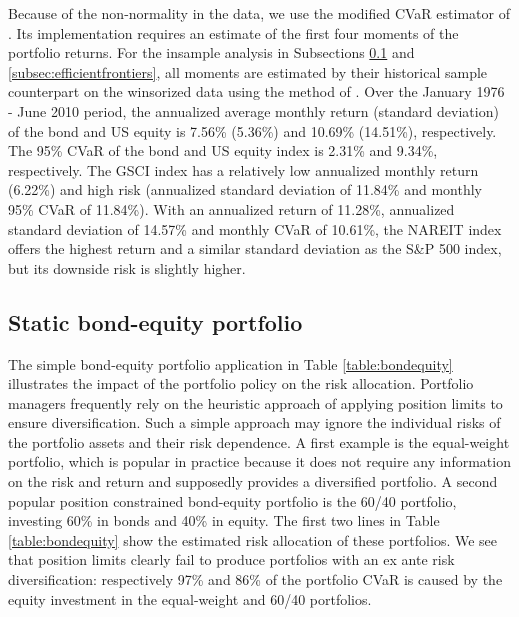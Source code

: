 \documentclass[12pt,a4paper]{article}
\begin{document}
Because of the non-normality in the data, we use the modified CVaR estimator of \citet{Boudt2007}. Its implementation requires an estimate of the first four moments of the portfolio returns. For the insample analysis in Subsections \ref{subsec:bondequity} and \ref{subsec:efficientfrontiers}, all moments are estimated by their historical sample counterpart on the winsorized data using the method of \citet{Boudt2007}. Over the January 1976 - June 2010 period, the annualized average monthly return (standard deviation) of the bond and US equity is 7.56\% (5.36\%) and 10.69\% (14.51\%), respectively. The 95\% CVaR of the bond and US equity index is 2.31\% and 9.34\%, respectively. The GSCI index has a relatively low annualized monthly return (6.22\%) and high risk (annualized standard deviation of 11.84\% and monthly 95\% CVaR of 11.84\%). With an annualized return of 11.28\%, annualized standard deviation of 14.57\% and monthly CVaR of 10.61\%, the NAREIT index offers the highest return and a similar standard deviation as the S\&P 500 index, but its downside risk is slightly higher.
 
 




\subsection{Static bond-equity portfolio}\label{subsec:bondequity}

The simple bond-equity portfolio application in Table \ref{table:bondequity} illustrates the impact of the portfolio policy on the risk allocation. Portfolio managers frequently rely on the heuristic approach of applying position limits to ensure diversification. Such a simple approach may ignore the individual risks of the portfolio assets and their risk dependence. A first example is the equal-weight portfolio, which is popular in practice because it does not require any information on the risk and return and supposedly provides a diversified portfolio. A second popular position constrained bond-equity portfolio is the 60/40 portfolio, investing 60\% in bonds and 40\% in equity. The first two lines in Table \ref{table:bondequity} show the estimated risk allocation of these portfolios.  We see that position limits clearly fail to produce portfolios with an ex ante risk diversification:  respectively 97\% and 86\% of the portfolio CVaR is caused by the equity investment in the equal-weight and 60/40 portfolios.
\end{document}

